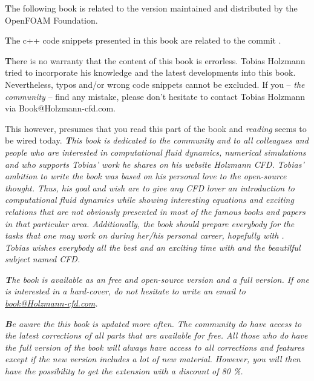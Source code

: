 \documentclass[MathematicsNumericsDerivationsAndOpenFOAM.tex]{subfiles}
\begin{document}


\newpage
%
%
    \textbf{T}he following book is related to the \OF version maintained and
    distributed by the OpenFOAM Foundation.

%
%
\vspace{20pt}
%
%
    \textbf{T}he c++ code snippets presented in this book are related to
    the \OF commit \DEV.

%
%
\vspace{20pt}
%
%
    \textbf{T}here is no warranty that the content of this book is errorless.
    Tobias Holzmann tried to incorporate his knowledge and the latest
    developments into this book. Nevertheless, typos and/or wrong code snippets
    cannot be excluded. If you -- \textit{the community} -- find any mistake,
    please don't hesitate to contact Tobias Holzmann via Book@Holzmann-cfd.com.

    This however, presumes that you read this part of the book and \textit{reading}
    seems to be wired today.
%
%
\newpage
%
%
%
\textit{
    \textbf{T}his book is dedicated to the \OF community and to all colleagues
    and people who are interested in computational fluid dynamics, numerical
    simulations and who supports Tobias' work he shares on his website Holzmann
    CFD. Tobias' ambition to write the book was based on his personal love to
    the open-source thought. Thus, his goal and wish are to give any CFD lover
    an introduction to computational fluid dynamics while showing interesting
    equations and exciting relations that are not obviously presented in most
    of the famous books and papers in that particular area. Additionally, the
    book should prepare everybody for the tasks that one may work on during
    her/his personal career, hopefully with \OF. Tobias wishes everybody all the
    best and an exciting time with \OF and the beautilful subject named CFD.
}

%
%
\vspace{20pt}
%
%
\textit{
    \textbf{T}he book is available as an free and open-source version and a full 
    version. If one is interested in a hard-cover, do not hesitate to write an email
    to \href{mailto:book@Holzmann-cfd.com}{\color{myCiteColor}book@Holzmann-cfd.com}.
}

%
%
\vspace{20pt}
%
%
\textit{
    \textbf{B}e aware the this book is updated more often. The \OF community do
    have access to the latest corrections of all parts that are available for free.
    All those who do have the full version of the book will always have access to
    all corrections and features except if the new version includes a lot of new
    material. However, you will then have the possibility to get the extension
    with a discount of 80 \%.
}
\end{document}
